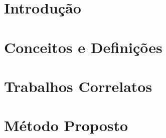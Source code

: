 \documentclass[
    12pt,       %
    oneside,    %
    a4paper,    %
%
    chapter=TITLE,	  	  %
%
    english,			  %
    brazil				  %
%
]{abntex2}
\begin{document}
\renewcommand{\contentsname}{Sumário}
\tableofcontents*
\cleardoublepage{}



\textual{}
\chapter{Introdução}\label{ch:introducao}


\chapter{Conceitos e Definições}\label{ch:fundamentacao}


\chapter{Trabalhos Correlatos}\label{ch:correlatos}



\chapter{Método Proposto}\label{ch:metodo}


\end{document}
